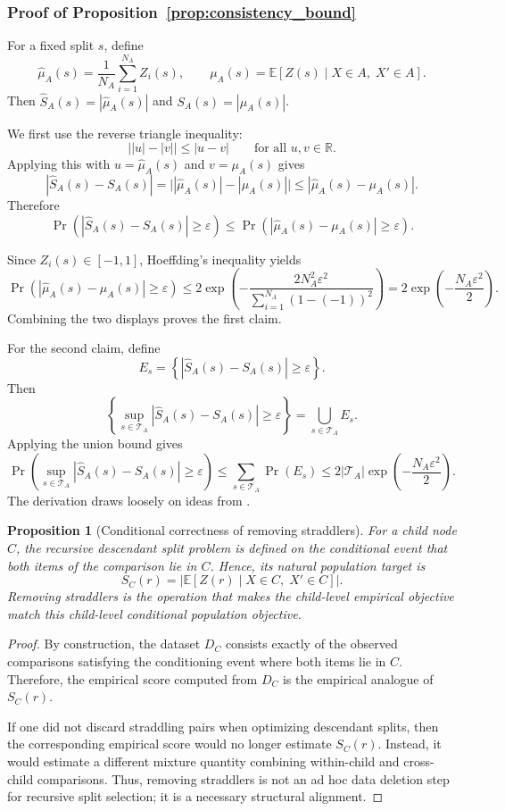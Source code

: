 \documentclass{article}
\newtheorem{proposition}{Proposition}
\begin{document}
\subsubsection*{Proof of Proposition~\ref{prop:consistency_bound}} \label{appendix:consistency_proof}

For a fixed split $s$, define
\[
\hat\mu_A(s)=\frac{1}{N_A}\sum_{i=1}^{N_A} Z_i(s),
\qquad
\mu_A(s)=\mathbb{E}[Z(s)\mid X\in A,\;X'\in A].
\]
Then $\widehat S_A(s)=|\hat\mu_A(s)|$ and $S_A(s)=|\mu_A(s)|$.

We first use the reverse triangle inequality:
\[
\bigl||u|-|v|\bigr| \le |u-v|
\qquad
\text{for all }u,v\in\mathbb{R}.
\]
Applying this with $u=\hat\mu_A(s)$ and $v=\mu_A(s)$ gives
\[
|\widehat S_A(s)-S_A(s)|
=
\bigl||\hat\mu_A(s)|-|\mu_A(s)|\bigr|
\le
|\hat\mu_A(s)-\mu_A(s)|.
\]
Therefore
\[
\Pr\!\left(
|\widehat S_A(s)-S_A(s)|\ge \varepsilon
\right)
\le
\Pr\!\left(
|\hat\mu_A(s)-\mu_A(s)|\ge \varepsilon
\right).
\]

Since $Z_i(s)\in[-1,1]$, Hoeffding's inequality yields
\[
\Pr\!\left(
|\hat\mu_A(s)-\mu_A(s)|\ge \varepsilon
\right)
\le
2\exp\!\left(
-\frac{2N_A^2\varepsilon^2}{\sum_{i=1}^{N_A}(1-(-1))^2}
\right)
=
2\exp\!\left(
-\frac{N_A\varepsilon^2}{2}
\right).
\]
Combining the two displays proves the first claim.

For the second claim, define
\[
E_s=\left\{|\widehat S_A(s)-S_A(s)|\ge \varepsilon\right\}.
\]
Then
\[
\left\{
\sup_{s\in\mathcal{T}_A}
|\widehat S_A(s)-S_A(s)|
\ge \varepsilon
\right\}
=
\bigcup_{s\in\mathcal{T}_A} E_s.
\]
Applying the union bound gives
\[
\Pr\!\left(
\sup_{s\in\mathcal{T}_A}
|\widehat S_A(s)-S_A(s)|
\ge \varepsilon
\right)
\le
\sum_{s\in\mathcal{T}_A}\Pr(E_s)
\le
2|\mathcal{T}_A|\exp\!\left(-\frac{N_A\varepsilon^2}{2}\right).
\]
The derivation draws loosely on ideas from \cite{jaworski2017new}.
\begin{proposition}[Conditional correctness of removing straddlers]
\label{prop:straddlers_conditional}
For a child node $C$, the recursive descendant split problem is defined on the conditional event that \emph{both} items of the comparison lie in $C$.
Hence, its natural population target is
\[
S_C(r)=
\left|
\mathbb{E}[Z(r)\mid X\in C,\;X'\in C]
\right|.
\]
Removing straddlers is the operation that makes the child-level empirical objective match this child-level conditional population objective.
\end{proposition}

\begin{proof}
By construction, the dataset $D_C$ consists exactly of the observed comparisons satisfying the conditioning event where both items lie in $C$. 
Therefore, the empirical score computed from $D_C$ is the empirical analogue of $S_C(r)$.

If one did not discard straddling pairs when optimizing descendant splits, then the corresponding empirical score would no longer estimate $S_C(r)$. Instead, it would estimate a different mixture quantity combining within-child and cross-child comparisons. 
Thus, removing straddlers is not an ad hoc data deletion step for recursive split selection; it is a necessary structural alignment.
\end{proof}
\end{document}
